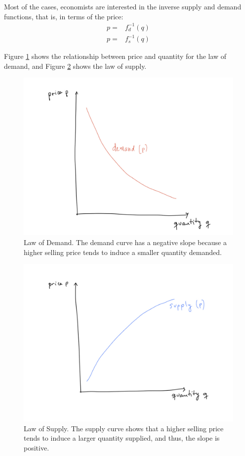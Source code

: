 \documentclass[11pt, letterpaper]{article}
\begin{document}
Most of the cases, economists are interested in the inverse supply and demand functions, that is, in terms of the price:
\begin{align}
    p= & f^{-1}_d(q) \\
    p= & f^{-1}_s(q)
\end{align}

Figure \ref{demand} shows the relationship between price and quantity for the law of demand, and Figure \ref{supply} shows the law of supply. 

\begin{figure}[ht!]
  \includegraphics[width=\textwidth]{Informe/demand.jpeg}
 \caption{Law of Demand. The demand curve has a negative slope because a higher selling price tends to induce a smaller quantity demanded.}
 \label{demand}
\end{figure}
 
\begin{figure}[ht!]
  \includegraphics[width=\textwidth]{Informe/supply.jpeg}
 \caption{Law of Supply. The supply curve shows that a higher selling price tends to induce a larger quantity supplied, and thus, the slope is positive.}
 \label{supply}
 \end{figure}
\end{document}
